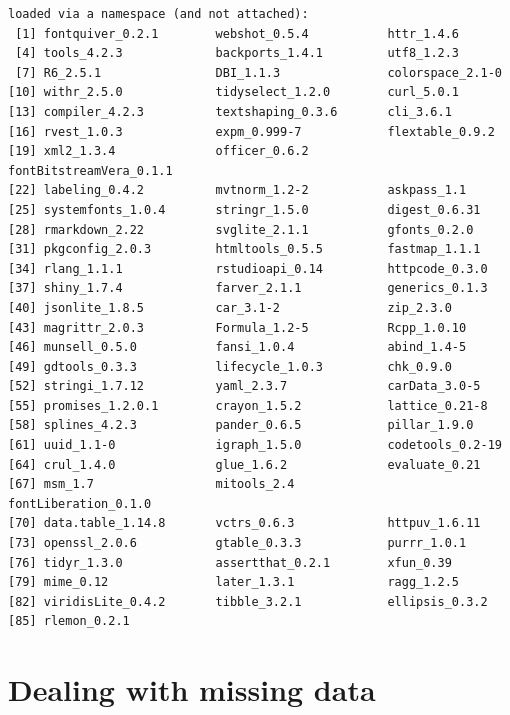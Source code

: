 \documentclass[
  letterpaper,
  DIV=11,
  numbers=noendperiod]{scrreprt}
\begin{document}
\begin{verbatim}
loaded via a namespace (and not attached):
 [1] fontquiver_0.2.1        webshot_0.5.4           httr_1.4.6             
 [4] tools_4.2.3             backports_1.4.1         utf8_1.2.3             
 [7] R6_2.5.1                DBI_1.1.3               colorspace_2.1-0       
[10] withr_2.5.0             tidyselect_1.2.0        curl_5.0.1             
[13] compiler_4.2.3          textshaping_0.3.6       cli_3.6.1              
[16] rvest_1.0.3             expm_0.999-7            flextable_0.9.2        
[19] xml2_1.3.4              officer_0.6.2           fontBitstreamVera_0.1.1
[22] labeling_0.4.2          mvtnorm_1.2-2           askpass_1.1            
[25] systemfonts_1.0.4       stringr_1.5.0           digest_0.6.31          
[28] rmarkdown_2.22          svglite_2.1.1           gfonts_0.2.0           
[31] pkgconfig_2.0.3         htmltools_0.5.5         fastmap_1.1.1          
[34] rlang_1.1.1             rstudioapi_0.14         httpcode_0.3.0         
[37] shiny_1.7.4             farver_2.1.1            generics_0.1.3         
[40] jsonlite_1.8.5          car_3.1-2               zip_2.3.0              
[43] magrittr_2.0.3          Formula_1.2-5           Rcpp_1.0.10            
[46] munsell_0.5.0           fansi_1.0.4             abind_1.4-5            
[49] gdtools_0.3.3           lifecycle_1.0.3         chk_0.9.0              
[52] stringi_1.7.12          yaml_2.3.7              carData_3.0-5          
[55] promises_1.2.0.1        crayon_1.5.2            lattice_0.21-8         
[58] splines_4.2.3           pander_0.6.5            pillar_1.9.0           
[61] uuid_1.1-0              igraph_1.5.0            codetools_0.2-19       
[64] crul_1.4.0              glue_1.6.2              evaluate_0.21          
[67] msm_1.7                 mitools_2.4             fontLiberation_0.1.0   
[70] data.table_1.14.8       vctrs_0.6.3             httpuv_1.6.11          
[73] openssl_2.0.6           gtable_0.3.3            purrr_1.0.1            
[76] tidyr_1.3.0             assertthat_0.2.1        xfun_0.39              
[79] mime_0.12               later_1.3.1             ragg_1.2.5             
[82] viridisLite_0.4.2       tibble_3.2.1            ellipsis_0.3.2         
[85] rlemon_0.2.1           
\end{verbatim}


\hypertarget{dealing-with-missing-data}{%
\chapter{Dealing with missing data}\label{dealing-with-missing-data}}
\end{document}
